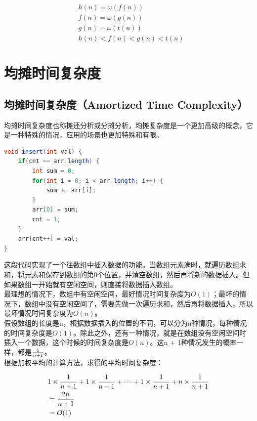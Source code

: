 \begin{align*}
     & h(n) = \omega(f(n))       \\
     & f(n) = \omega(g(n))       \\
     & g(n) = \omega(t(n))       \\
     & h(n) < f(n) < g(n) < t(n)
\end{align*}

\newpage

\section{均摊时间复杂度}

\subsection{均摊时间复杂度（Amortized Time Complexity）}

均摊时间复杂度也称摊还分析或分摊分析，均摊复杂度是一个更加高级的概念，它是一种特殊的情况，应用的场景也更加特殊和有限。

\begin{lstlisting}[language=Java]
void insert(int val) {
    if(cnt == arr.length) {
        int sum = 0;
        for(int i = 0; i < arr.length; i++) {
            sum += arr[i];
        }
        arr[0] = sum;
        cnt = 1;
    }
    arr[cnt++] = val;
}
\end{lstlisting}

这段代码实现了一个往数组中插入数据的功能。当数组元素满时，就遍历数组求和，将元素和保存到数组的第0个位置，并清空数组，然后再将新的数据插入。但如果数组一开始就有空闲空间，则直接将数据插入数组。 \\

最理想的情况下，数组中有空闲空间，最好情况时间复杂度为$ O(1) $；最坏的情况下，数组中没有空闲空间了，需要先做一次遍历求和，然后再将数据插入，所以最坏情况时间复杂度为$ O(n) $。 \\

假设数组的长度是n，根据数据插入的位置的不同，可以分为n种情况，每种情况的时间复杂度是$ O(1) $。除此之外，还有一种情况，就是在数组没有空闲空间时插入一个数据，这个时候的时间复杂度是$ O(n) $。这n + 1种情况发生的概率一样，都是$ 1 \over n+1 $。 \\

根据加权平均的计算方法，求得的平均时间复杂度：

\vspace{-0.5cm}

\begin{align*}
     & 1 \times {1 \over n+1} + 1 \times {1 \over n+1} + \dots + 1 \times {1 \over n+1} + n \times {1 \over n+1} \\
     & = {2n \over n+1}                                                                                          \\
     & = O(1)
\end{align*}

